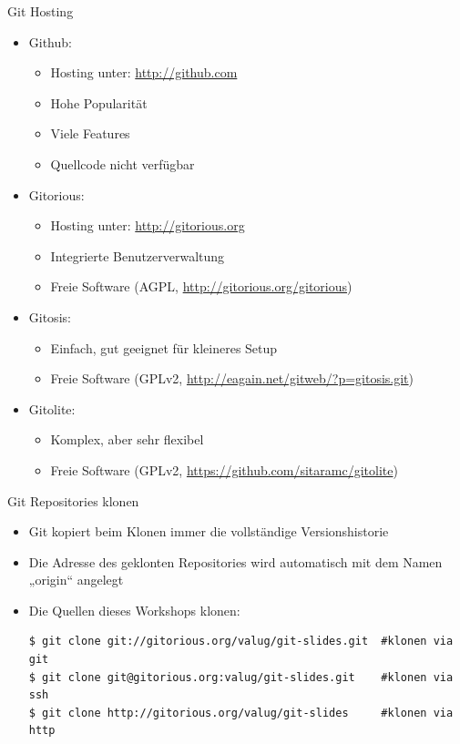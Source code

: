 \begin{frame}[allowframebreaks]{Git Hosting}
  \begin{itemize}
    \item Github:
    \begin{itemize}
      \item Hosting unter: \url{http://github.com}
      \item Hohe Popularität
      \item Viele Features
      \item Quellcode nicht verfügbar
    \end{itemize}
    \item Gitorious:
    \begin{itemize}
      \item Hosting unter: \url{http://gitorious.org}
      \item Integrierte Benutzerverwaltung
      \item Freie Software (AGPL, \url{http://gitorious.org/gitorious})
    \end{itemize}
  \framebreak
    \item Gitosis:
    \begin{itemize}
      \item Einfach, gut geeignet für kleineres Setup
      \item Freie Software (GPLv2, \url{http://eagain.net/gitweb/?p=gitosis.git})
    \end{itemize}
    \item Gitolite:
    \begin{itemize}
      \item Komplex, aber sehr flexibel 
      \item Freie Software (GPLv2, \url{https://github.com/sitaramc/gitolite})
    \end{itemize}
  \end{itemize}
\end{frame}

\begin{frame}[fragile]{Git Repositories klonen}
  \begin{itemize}
    \item Git kopiert beim Klonen immer die vollständige Versionshistorie
    \item Die Adresse des geklonten Repositories wird automatisch mit dem Namen „origin“ angelegt
    \item Die Quellen dieses Workshops klonen:
    \begin{lstlisting}
$ git clone git://gitorious.org/valug/git-slides.git  #klonen via git
$ git clone git@gitorious.org:valug/git-slides.git    #klonen via ssh
$ git clone http://gitorious.org/valug/git-slides     #klonen via http
    \end{lstlisting}
  \end{itemize}
\end{frame}

